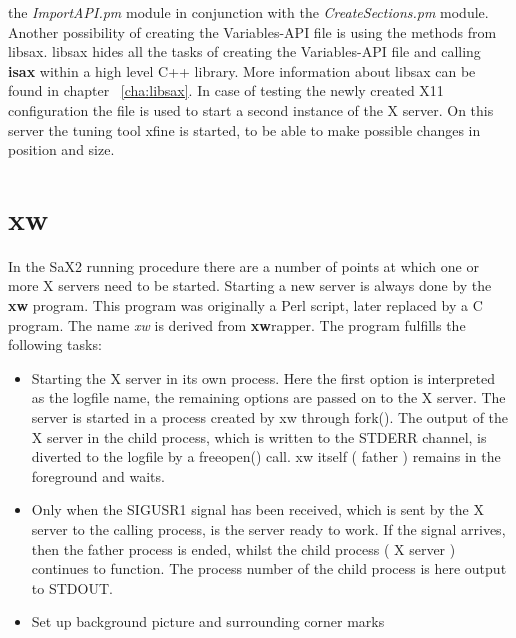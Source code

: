 \begin{itemize}
      the \textit{ImportAPI.pm} module in conjunction with the
      \textit{CreateSections.pm} module. Another possibility of creating
	  the Variables-API file is using the methods from libsax. libsax
      hides all the tasks of creating the Variables-API file and calling
      \textbf{isax} within a high level C++ library. More information
	  about libsax can be found in chapter ~\ref{cha:libsax}.
      In case of testing the newly created X11 configuration the
      file is used to start a second instance of the X server. On this server
      the tuning tool xfine is started, to be able to make possible changes in
      position and size.
\end{itemize}

\section{xw}
\label{sec:xw}
In the SaX2 running procedure there are a number of points at which one or
more X servers need to be started. Starting a new server is always done by the
\textbf{xw} program.
This program was originally a Perl script, later replaced by a C program. The
name \textit{xw} is derived from \textbf{xw}rapper. The program fulfills the
following tasks:
\begin{itemize}
\item Starting the X server in its own process. Here the first option is
      interpreted as the logfile name, the remaining options are passed on to
	  the X server. The server is started in a process created by xw through
      fork(). The output of the X server in the child process, which is written
      to the STDERR channel, is diverted to the logfile by a freeopen() call.
      xw itself ( father ) remains in the foreground and waits. 
\item Only when the SIGUSR1 signal has been received, which is sent by the X
      server to the calling process, is the server ready to work. If the signal
      arrives, then the father process is ended, whilst the child process ( X
      server ) continues to function. The process number of the child process is
      here output to STDOUT.
\item Set up background picture and surrounding corner marks
\end{itemize}


